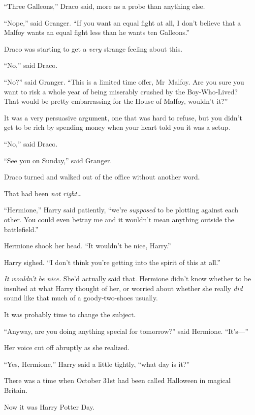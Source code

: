 “Three Galleons,” Draco said, more as a probe than anything else.

“Nope,” said Granger. “If you want an equal fight at all, I don’t believe that a Malfoy wants an equal fight less than he wants ten Galleons.”

Draco was starting to get a \emph{very} strange feeling about this.

“No,” said Draco.

“No?” said Granger. “This is a limited time offer, Mr~Malfoy. Are you sure you want to risk a whole year of being miserably crushed by the Boy-Who-Lived? That would be pretty embarrassing for the House of Malfoy, wouldn’t it?”

It was a very persuasive argument, one that was hard to refuse, but you didn’t get to be rich by spending money when your heart told you it was a setup.

“No,” said Draco.

“See you on Sunday,” said Granger.

Draco turned and walked out of the office without another word.

That had been \emph{not right…}

\later

“Hermione,” Harry said patiently, “we’re \emph{supposed} to be plotting against each other. You could even betray me and it wouldn’t mean anything outside the battlefield.”

Hermione shook her head. “It wouldn’t be nice, Harry.”

Harry sighed. “I don’t think you’re getting into the spirit of this at all.”

\emph{It wouldn’t be nice.} She’d actually said that. Hermione didn’t know whether to be insulted at what Harry thought of her, or worried about whether she really \emph{did} sound like that much of a goody-two-shoes usually.

It was probably time to change the subject.

“Anyway, are you doing anything special for tomorrow?” said Hermione. “It’s—”

Her voice cut off abruptly as she realized.

“Yes, Hermione,” Harry said a little tightly, “what day is it?”


There was a time when October 31st had been called Halloween in magical Britain.

Now it was Harry Potter Day.


